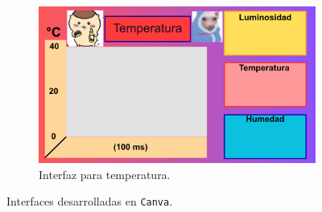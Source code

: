 \begin{figure}[h!]
    \begin{subfigure}[t]{0.45\textwidth}
        \centering
        \includegraphics[width=\textwidth]{Diagramas/3.png}
        \caption{Interfaz para temperatura.}
        \label{fig:sub3}
    \end{subfigure}

    \caption{Interfaces desarrolladas en \texttt{Canva}.}
    \label{fig:tres_imagenes}
\end{figure}
